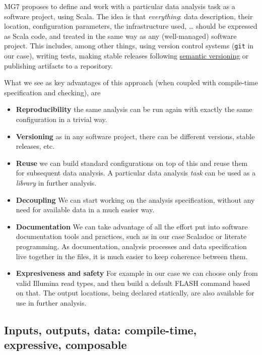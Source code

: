 \documentclass{frontiersSCNS} %
\providecommand{\tightlist}{%
\setlength{\itemsep}{0pt}\setlength{\parskip}{0pt}}
\begin{document}
MG7 proposes to define and work with a particular data analysis task as
a software project, using Scala. The idea is that \emph{everything}:
data description, their location, configuration parameters, the
infrastructure used, \ldots{} should be expressed as Scala code, and
treated in the same way as any (well-managed) software project. This
includes, among other things, using version control systems
(\texttt{git} in our case), writing tests, making stable releases
following \href{http://semver.org/}{semantic versioning} or publishing
artifacts to a repository.

What we see as key advantages of this approach (when coupled with
compile-time specification and checking), are

\begin{itemize}
\tightlist
\item
  \textbf{Reproducibility} the same analysis can be run again with
  exactly the same configuration in a trivial way.
\item
  \textbf{Versioning} as in any software project, there can be different
  versions, stable releases, etc.
\item
  \textbf{Reuse} we can build standard configurations on top of this and
  reuse them for subsequent data analysis. A particular data analysis
  \emph{task} can be used as a \emph{library} in further analysis.
\item
  \textbf{Decoupling} We can start working on the analysis
  specification, without any need for available data in a much easier
  way.
\item
  \textbf{Documentation} We can take advantage of all the effort put
  into software documentation tools and practices, such as in our case
  Scaladoc or literate programming. As documentation, analysis processes
  and data specification live together in the files, it is much easier
  to keep coherence between them.
\item
  \textbf{Expresiveness and safety} For example in our case we can
  choose only from valid Illumina read types, and then build a default
  FLASH command based on that. The output locations, being declared
  statically, are also available for use in further analysis.
\end{itemize}

\subsection{Inputs, outputs, data: compile-time, expressive,
composable}\label{inputs-outputs-data-compile-time-expressive-composable}
\end{document}
